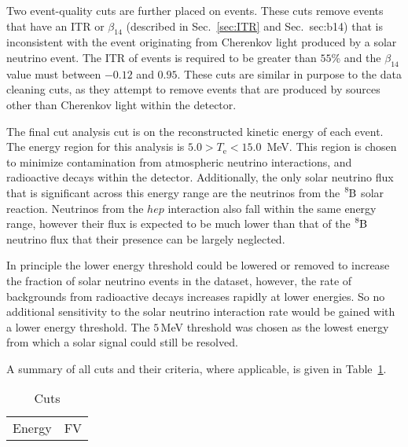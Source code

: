 Two event-quality cuts are further placed on events. These cuts remove events
that have an ITR or $\beta_{14}$ (described in Sec.~\ref{sec:ITR} and Sec.~{sec:b14})
that is inconsistent with the event originating from Cherenkov light produced
by a solar neutrino event.
The ITR of events is required to be greater than $55$\% and the $\beta_{14}$
value must between $-0.12$ and $0.95$.
These cuts are similar in purpose to the data cleaning cuts, as they attempt to
remove events that are produced by sources other than Cherenkov light within
the detector.

The final cut analysis cut is on the reconstructed kinetic energy of each event.
The energy region for this analysis is $5.0 > T_{\mathrm{e}} < 15.0$\, MeV.
This region is chosen to minimize contamination from atmospheric neutrino
interactions, and radioactive decays within the detector.
Additionally, the only solar neutrino flux that is significant across this energy range
are the neutrinos from the $\ce{^{8}B}$ solar reaction.
Neutrinos from the $hep$ interaction also fall within the same energy range,
however their flux is expected to be much lower than that of the $\ce{^{8}B}$
neutrino flux that their presence can be largely neglected.

In principle the lower energy threshold could be lowered or removed to
increase the fraction of solar neutrino events in the dataset, however,
the rate of backgrounds from radioactive decays increases rapidly at lower
energies. So no additional sensitivity to the solar neutrino interaction
rate would be gained with a lower energy threshold.
The $5$\,MeV threshold was chosen as the lowest energy from which a solar
signal could still be resolved.

A summary of all cuts and their criteria, where applicable, is given in Table~\ref{tbl:event_selection}.

\begin{table}
    \centering
  \begin{tabular}{c  c}
        Energy & FV\\
    \end{tabular}
    \caption{Cuts}
\label{tbl:event_selection}
\end{table}

